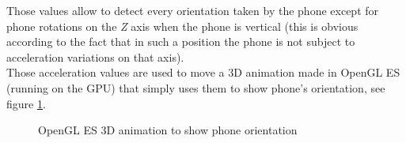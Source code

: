 \documentclass[conference]{IEEEtran}
\begin{document}
Those values allow to detect every orientation taken by the phone except for phone rotations on the \textit{Z} axis when the phone is vertical (this is obvious according to the fact that in such a position the phone is not subject to acceleration variations on that axis).\\
Those acceleration values are used to move a 3D animation made in OpenGL ES (running on the GPU) that simply uses them to show phone's orientation, see figure \ref{img:opengl}.

\begin{figure}[!ht]
\begin{center}
\caption{OpenGL ES 3D animation to show phone orientation}
\label{img:opengl}
\end{center}
\end{figure}
\end{document}
